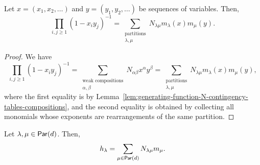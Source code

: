 \begin{proposition} \label{prop:generating-function-N-contingency-tables-partitions}
	Let \(x = (x_1, x_2, \ldots)\) and \(y = (y_1, y_2, \ldots)\) be sequences of variables.
	Then,
	\begin{equation}
		\prod_{i, j \geq 1} (1 - x_iy_j)^{-1} = \sum_{\substack{\text{partitions} \\ \lambda, \mu}} N_{\lambda\mu} m_\lambda(x) m_\mu(y).
	\end{equation}
\end{proposition}

\begin{proof}
	We have
	\begin{equation}
		\prod_{i, j \geq 1} (1 - x_iy_j)^{-1}
		= \sum_{\substack{\text{weak compositions} \\ \alpha, \beta}} N_{\alpha\beta} x^\alpha y^\beta
		= \sum_{\substack{\text{partitions} \\ \lambda, \mu}} N_{\lambda\mu} m_\lambda(x) m_\mu(y),
	\end{equation}
	where the first equality is by Lemma~\ref{lem:generating-function-N-contingency-tables-compositions},
	and the second equality is obtained by collecting all monomials whose exponents are rearrangements of the same partition.
\end{proof}

\begin{proposition} \label{prop:hl-expansion-in-m-basis}
	Let \(\lambda, \mu \in \operatorname{\mathsf{Par}}(d)\).
	Then,
	\begin{equation}
		h_\lambda = \sum_{\mu \in \operatorname{\mathsf{Par}}(d)} N_{\lambda\mu}m_\mu.
	\end{equation}
\end{proposition}

